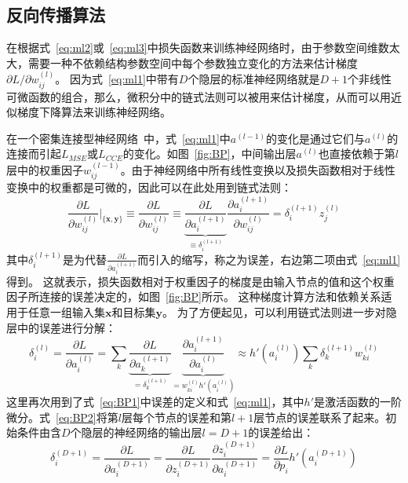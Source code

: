 \subsection{反向传播算法}
\label{sec:BackProp}

在根据式~\ref{eq:ml2}或~\ref{eq:ml3}中损失函数来训练神经网络时，由于参数空间维数太大，需要一种不依赖结构参数空间中每个参数独立变化的方法来估计梯度$\partial L / \partial w_{ij}^{(l)}$。
因为式~\ref{eq:ml1}中带有$D$个隐层的标准神经网络就是$D+1$个非线性可微函数的组合，那么，微积分中的链式法则可以被用来估计梯度，从而可以用近似梯度下降算法来训练神经网络。

在一个密集连接型神经网络~\cite{DenNet}中，式~\ref{eq:ml1}中$a^{(l-1)}$的变化是通过它们与$a^{(l)}$的连接而引起$L_{MSE}$或$L_{CCE}$的变化。如图~\ref{fig:BP}，中间输出层$a^{(l)}$也直接依赖于第$l$层中的权重因子$w_{ij}^{(l-1)}$。由于神经网络中所有线性变换以及损失函数相对于线性变换中的权重都是可微的，因此可以在此处用到链式法则：
\begin{equation} 
\label{eq:BP1}	
\frac{\partial L}{\partial w_{ij}^{(l)}} \bigg\rvert_{\{\boldsymbol{x},\boldsymbol{y}\}} \equiv \frac{\partial L}{\partial w_{ij}^{(l)}} \equiv \underbrace{\frac{\partial L}{\partial a_{i}^{(l+1)}}}_{\equiv \delta_{i}^{(l+1)}} \frac{\partial a_{i}^{(l+1)}}{\partial w_{ij}^{(l)}} = \delta_{i}^{(l+1)}z_{j}^{(l)}
\end{equation}
其中$\delta_{i}^{(l+1)}$是为代替$\frac{\partial L}{\partial a_{i}^{(l+1)}}$而引入的缩写，称之为误差，右边第二项由式~\ref{eq:ml1}得到。
这就表示，损失函数相对于权重因子的梯度是由输入节点的值和这个权重因子所连接的误差决定的，如图~\ref{fig:BP}所示。
这种梯度计算方法和依赖关系适用于任意一组输入集$\boldsymbol{x}$和目标集$\boldsymbol{y}$。
为了方便起见，可以利用链式法则进一步对隐层中的误差进行分解：
\begin{equation} 
\label{eq:BP2}	
\delta_{i}^{(l)}=\frac{\partial L}{\partial a_{i}^{(l)}}=\sum_k \underbrace{\frac{\partial L}{\partial a_{k}^{(l+1)}}}_{= \delta_{k}^{(l+1)}} \underbrace{\frac{\partial a_{i}^{(l+1)}}{\partial a_{i}^{(l)}}}_{= w_{ki}^{(l)}h' \left( a_{i}^{(l)} \right) } \approx h' \left( a_{i}^{(l)} \right) \sum_k \delta_{k}^{(l+1)} w_{ki}^{(l)}
\end{equation}
这里再次用到了式~\ref{eq:BP1}中误差的定义和式~\ref{eq:ml1}，其中$h'$是激活函数的一阶微分。式~\ref{eq:BP2}将第$l$层每个节点的误差和第$l+1$层节点的误差联系了起来。初始条件由含$D$个隐层的神经网络的输出层$l=D+1$的误差给出：
\begin{equation} 
\label{eq:BP3}	
\delta_{i}^{(D+1)}=\frac{\partial L}{\partial a_{i}^{(D+1)}}= \frac{\partial L}{\partial z_{i}^{(D+1)}} \frac{\partial z_{i}^{(D+1)}}{\partial a_{i}^{(D+1)}} = \frac{\partial L}{\partial p_{i}} h' \left( a_{i}^{(D+1)} \right)
\end{equation}
